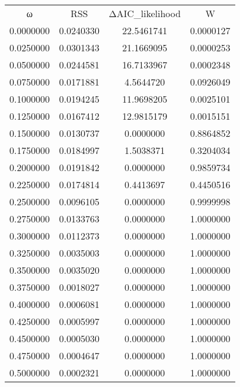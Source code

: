 \begin{tabular}{cccc}
ω & RSS & ΔAIC_likelihood & W\\
0.0000000 & 0.0240330 & 22.5461741 & 0.0000127\\
0.0250000 & 0.0301343 & 21.1669095 & 0.0000253\\
0.0500000 & 0.0244581 & 16.7133967 & 0.0002348\\
0.0750000 & 0.0171881 & 4.5644720 & 0.0926049\\
0.1000000 & 0.0194245 & 11.9698205 & 0.0025101\\
0.1250000 & 0.0167412 & 12.9815179 & 0.0015151\\
0.1500000 & 0.0130737 & 0.0000000 & 0.8864852\\
0.1750000 & 0.0184997 & 1.5038371 & 0.3204034\\
0.2000000 & 0.0191842 & 0.0000000 & 0.9859734\\
0.2250000 & 0.0174814 & 0.4413697 & 0.4450516\\
0.2500000 & 0.0096105 & 0.0000000 & 0.9999998\\
0.2750000 & 0.0133763 & 0.0000000 & 1.0000000\\
0.3000000 & 0.0112373 & 0.0000000 & 1.0000000\\
0.3250000 & 0.0035003 & 0.0000000 & 1.0000000\\
0.3500000 & 0.0035020 & 0.0000000 & 1.0000000\\
0.3750000 & 0.0018027 & 0.0000000 & 1.0000000\\
0.4000000 & 0.0006081 & 0.0000000 & 1.0000000\\
0.4250000 & 0.0005997 & 0.0000000 & 1.0000000\\
0.4500000 & 0.0005030 & 0.0000000 & 1.0000000\\
0.4750000 & 0.0004647 & 0.0000000 & 1.0000000\\
0.5000000 & 0.0002321 & 0.0000000 & 1.0000000\\
\end{tabular}
